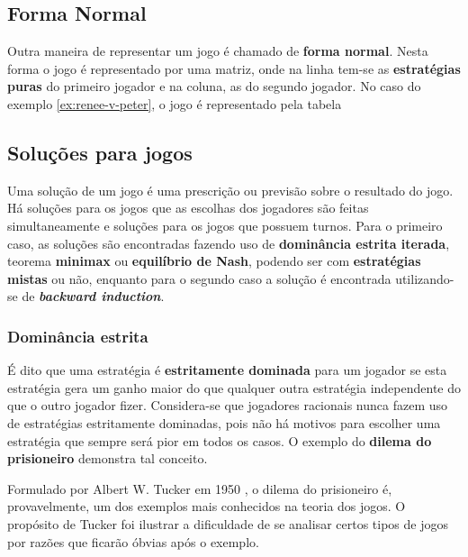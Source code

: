 \subsection{Forma Normal}
\label{subsec:forma-normal}

Outra maneira de representar um jogo é chamado de \textbf{forma normal}. Nesta forma o jogo é representado por uma matriz, onde na linha tem-se as \textbf{estratégias puras} do primeiro jogador e na coluna, as do segundo jogador. No caso do exemplo \ref{ex:renee-v-peter}, o jogo é representado pela tabela %






\subsection{Soluções para jogos}
Uma solução de um jogo é uma prescrição ou previsão sobre o resultado do jogo. Há soluções para os jogos que as escolhas dos jogadores são feitas simultaneamente e soluções para os jogos que possuem turnos. Para o primeiro caso, as soluções são encontradas fazendo uso de \textbf{dominância estrita iterada}, teorema \textbf{minimax} ou \textbf{equilíbrio de Nash}, podendo ser com \textbf{estratégias mistas} ou não, enquanto para o segundo caso a solução é encontrada utilizando-se de \textbf{\emph{backward induction}}.

\subsubsection{Dominância estrita}

É dito que uma estratégia é {\bfseries estritamente dominada} para um jogador se esta estratégia gera um ganho maior do que qualquer outra estratégia independente do que o outro jogador fizer. Considera-se que jogadores racionais nunca fazem uso de estratégias estritamente dominadas, pois não há motivos para escolher uma estratégia que sempre será pior em todos os casos. O exemplo do {\bfseries dilema do prisioneiro} demonstra tal conceito.

Formulado por Albert W. Tucker em 1950 \cite{sartini_IIbienaldasbm}, o dilema do prisioneiro é, provavelmente, um dos exemplos mais conhecidos na teoria dos jogos. O propósito de Tucker foi ilustrar a dificuldade de se analisar certos tipos de jogos por razões que ficarão óbvias após o exemplo.


